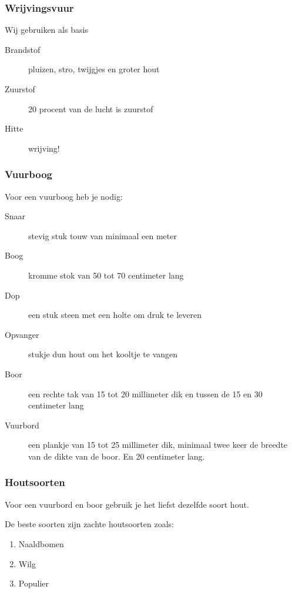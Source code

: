 \documentclass[a4paper, handout]{beamer}
\begin{document}
\begin{frame}
	\frametitle{Wrijvingsvuur}
	Wij gebruiken als basis	
	\begin{description}
		\item[Brandstof] pluizen, stro, twijgjes en groter hout
		\item[Zuurstof] 20 procent van de lucht is zuurstof
		\item[Hitte] wrijving!
	\end{description}
\end{frame}

\begin{frame}
	\frametitle{Vuurboog}
	Voor een vuurboog heb je nodig:
	
	\begin{description}
		\item[Snaar] stevig stuk touw van minimaal een meter
		\item[Boog] kromme stok van 50 tot 70 centimeter lang
		\item[Dop] een stuk steen met een holte om druk te leveren
		\item[Opvanger] stukje dun hout om het kooltje te vangen
		\item[Boor] een rechte tak van 15 tot 20 millimeter dik en tussen de 15 en 30 centimeter lang
		\item[Vuurbord] een plankje van 15 tot 25 millimeter dik, minimaal twee keer de breedte van de dikte van de boor. En 20 centimeter lang.
	\end{description}
\end{frame}

\begin{frame}
	\frametitle{Houtsoorten}
	Voor een vuurbord en boor gebruik je het liefst dezelfde soort hout.

	De beste soorten zijn zachte houtsoorten zoals:
	\begin{enumerate}
		\item{Naaldbomen}
		\item{Wilg}
		\item{Populier}
	\end{enumerate}
	
\end{frame}
\end{document}
